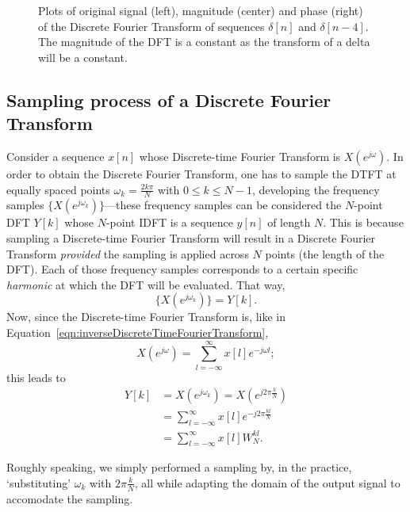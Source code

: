 \documentclass[\documentfontsize, twocolumn]{\classname}
\begin{document}
\begin{figure*}[ht]
\begin{center}
\scalebox{0.6}{

}\caption{Plots of original signal (left), magnitude (center) and phase (right) of the Discrete Fourier Transform of sequences $\delta[n]$ and $\delta[n-4]$. The magnitude of the DFT is a constant as the transform of a delta will be a constant.}\label{oct:dftImpulse}
\end{center}
\end{figure*}

\subsection{Sampling process of a Discrete Fourier Transform}

Consider a sequence $x[n]$ whose Discrete-time Fourier Transform is $X(e^{j\omega})$. In order to obtain the Discrete Fourier Transform, one has to sample the DTFT at equally spaced points $\omega_k = \frac{2k\pi}{N}$ with $0 \leq k \leq N-1$, developing the frequency samples $\{X(e^{j\omega_k})\}$---these frequency samples can be considered the $N$-point DFT $Y[k]$ whose $N$-point IDFT is a sequence $y[n]$ of length $N$. This is because sampling a Discrete-time Fourier Transform will result in a Discrete Fourier Transform \emph{provided} the sampling is applied across $N$ points (the length of the DFT). Each of those frequency samples corresponds to a certain specific \emph{harmonic} at which the DFT will be evaluated. That way, \[\{X(e^{j\omega_k})\} = Y[k].\]
Now, since the Discrete-time Fourier Transform is, like in Equation~\ref{eqn:inverseDiscreteTimeFourierTransform},
\[
    X(e^{j\omega}) = \sum_{l=-\infty}^\infty x[l] e^{-j\omega l};
\]
this leads to
\begin{align*}
    Y[k]
    &=  X(e^{j\omega_k}) = X\left(e^{j2\pi \frac k N}\right)\\
    &= \sum_{l=-\infty}^\infty x[l] e^{-j2\pi \frac{kl}{N}}\\
    &= \sum_{l=-\infty}^\infty x[l]W_N^{kl}.
\end{align*}

Roughly speaking, we simply performed a sampling by, in the practice, `substituting' $\omega_k$ with $2\pi \frac k N$, all while adapting the domain of the output signal to accomodate the sampling.
\end{document}
